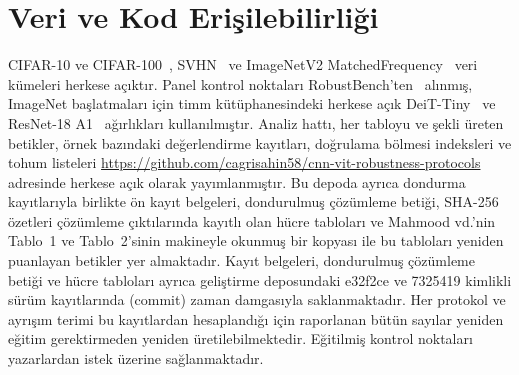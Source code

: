 \documentclass[journal]{IEEEtran}
\begin{document}
\section*{Veri ve Kod Erişilebilirliği}
CIFAR-10 ve CIFAR-100~\cite{krizhevsky2009learning}, SVHN~\cite{netzer2011reading} ve ImageNetV2 MatchedFrequency~\cite{recht2019imagenet} veri kümeleri herkese açıktır. Panel kontrol noktaları RobustBench'ten~\cite{croce2021robustbench} alınmış, ImageNet başlatmaları için timm kütüphanesindeki herkese açık DeiT-Tiny~\cite{touvron2021training} ve ResNet-18 A1~\cite{wightman2021resnet} ağırlıkları kullanılmıştır. Analiz hattı, her tabloyu ve şekli üreten betikler, örnek bazındaki değerlendirme kayıtları, doğrulama bölmesi indeksleri ve tohum listeleri \url{https://github.com/cagrisahin58/cnn-vit-robustness-protocols} adresinde herkese açık olarak yayımlanmıştır. Bu depoda ayrıca dondurma kayıtlarıyla birlikte ön kayıt belgeleri, dondurulmuş çözümleme betiği, SHA-256 özetleri çözümleme çıktılarında kayıtlı olan hücre tabloları ve Mahmood vd.'nin~\cite{mahmood2021robustness} Tablo~1 ve Tablo~2'sinin makineyle okunmuş bir kopyası ile bu tabloları yeniden puanlayan betikler yer almaktadır. Kayıt belgeleri, dondurulmuş çözümleme betiği ve hücre tabloları ayrıca geliştirme deposundaki e32f2ce ve 7325419 kimlikli sürüm kayıtlarında (commit) zaman damgasıyla saklanmaktadır. Her protokol ve ayrışım terimi bu kayıtlardan hesaplandığı için raporlanan bütün sayılar yeniden eğitim gerektirmeden yeniden üretilebilmektedir. Eğitilmiş kontrol noktaları yazarlardan istek üzerine sağlanmaktadır.
\end{document}
